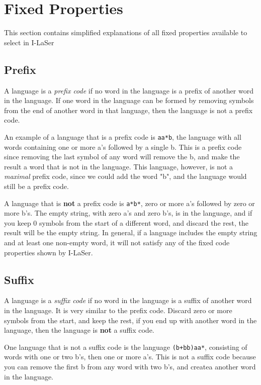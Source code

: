 \documentclass{article}
\begin{document}
\section{Fixed Properties}

This section contains simplified explanations of all fixed properties available to select in I-LaSer

\subsection{Prefix}
A language is a \textit{prefix code} if no word in the language is a prefix of another word in the language. If one word in the language can be formed by removing symbols from the end of another word in that language, then the language is not a prefix code. 

\par An example of a language that is a prefix code is \verb-aa*b-, the language with all words containing one or more a's followed by a single b. This is a prefix code since removing the last symbol of any word will remove the b, and make the result a word that is not in the language. This language, however, is not a \textit{maximal} prefix code, since we could add the word "b", and the language would still be a prefix code. 

\par A language that is \textbf{not} a prefix code is \verb-a*b*-, zero or more a's followed by zero or more b's. The empty string, with zero a's and zero b's, is in the language, and if you keep 0 symbols from the start of a different word, and discard the rest, the result will be the empty string. In general, if a language includes the empty string and at least one non-empty word, it will not satisfy any of the fixed code properties shown by I-LaSer. 

\subsection{Suffix}
A language is a \textit{suffix code} if no word in the language is a suffix of another word in the language. It is very similar to the prefix code. Discard zero or more symbols from the start, and keep the rest, if you end up with another word in the language, then the language is \textbf{not} a suffix code. 

\par One language that is not a suffix code is the language \verb-(b+bb)aa*-, consisting of words with one or two b's, then one or more a's. This is not a suffix code because you can remove the first b from any word with two b's, and createa another word in the language. 
\end{document}
